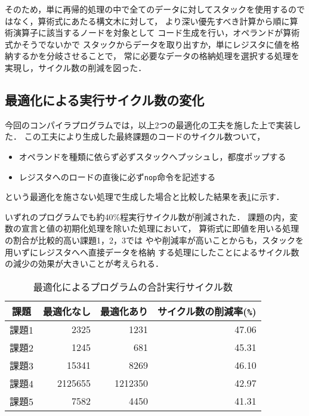 そのため，単に再帰的処理の中で全てのデータに対してスタックを使用するのではなく，算術式にあたる構文木に対して，
より深い優先すべき計算から順に算術演算子に該当するノードを対象として
コード生成を行い，オペランドが算術式かそうでないかで
スタックからデータを取り出すか，単にレジスタに値を格納するかを分岐させることで，
常に必要なデータの格納処理を選択する処理を実現し，サイクル数の削減を図った．


\subsection{最適化による実行サイクル数の変化}
今回のコンパイラプログラムでは，以上2つの最適化の工夫を施した上で実装した．
この工夫により生成した最終課題のコードのサイクル数ついて，
\begin{itemize}
  \item オペランドを種類に依らず必ずスタックへプッシュし，都度ポップする
  \item レジスタへのロードの直後に必ず\verb|nop|命令を記述する
\end{itemize}
という最適化を施さない処理で生成した場合と比較した結果を表\ref{tab:cycle-tab}に示す．

いずれのプログラムでも約40\%程実行サイクル数が削減された．
課題の内，変数の宣言と値の初期化処理を除いた処理において，
算術式に即値を用いる処理の割合が比較的高い課題1，2，3では
やや削減率が高いことからも，スタックを用いずにレジスタへへ直接データを格納
する処理にしたことによるサイクル数の減少の効果が大きいことが考えられる．

\begin{table}[htbp]
  \centering
  \begin{tabular}{|c|r|r|r|}
    \hline
      課題 & 最適化なし & 最適化あり & サイクル数の削減率(\verb|%|)\\
    \hline
    \hline
      課題1 & 2325 & 1231 & 47.06\\
    \hline
      課題2 & 1245 & 681 & 45.31\\
    \hline
      課題3 & 15341 & 8269 & 46.10\\
    \hline
      課題4 & 2125655 & 1212350 & 42.97\\
    \hline
      課題5 & 7582 & 4450 & 41.31 \\
    \hline
  \end{tabular}
  \caption{最適化によるプログラムの合計実行サイクル数}
  \label{tab:cycle-tab}
\end{table}


